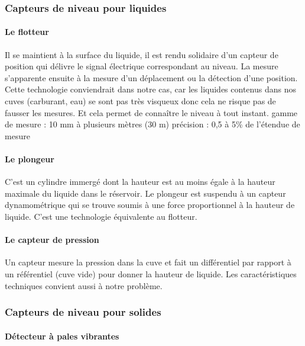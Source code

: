 \subsubsection{Capteurs de niveau pour liquides}

\paragraph{Le flotteur}

Il se maintient à la surface du liquide, il est rendu solidaire d'un capteur de position qui délivre le signal électrique correspondant au niveau. La mesure s'apparente ensuite à la mesure d'un déplacement ou la détection d'une position.
Cette technologie conviendrait dans notre cas, car les liquides contenus dans nos cuves (carburant, eau) se sont pas très visqueux donc cela ne risque pas de fausser les mesures. Et cela permet de connaître le niveau à tout instant.
gamme de mesure : 10 mm à plusieurs mètres (30 m)
précision : 0,5 à 5\% de l'étendue de mesure

\paragraph{Le plongeur}

C'est un cylindre immergé dont la hauteur est au moins égale à la hauteur maximale du liquide dans le réservoir. Le plongeur est suspendu à un capteur dynamométrique qui se trouve soumis à une force proportionnel à la hauteur de liquide. C’est une technologie équivalente au flotteur.

\paragraph{Le capteur de pression}

Un capteur mesure la pression dans la cuve et fait un différentiel par rapport à un référentiel (cuve vide) pour donner la hauteur de liquide. Les caractéristiques techniques convient aussi à notre problème.

\subsubsection{Capteurs de niveau pour solides}

\paragraph{Détecteur à pales vibrantes}

